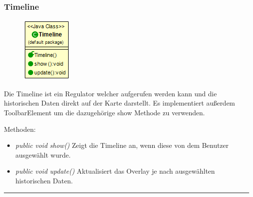 \subsubsection{Timeline}
\begin{minipage}{0.3\textwidth}
    \begin{figure}[H]
        {\centering\includegraphics[scale = 0.7
        ]{media/view/toolbar/Timeline_Class.png}}
    \end{figure}
    \end{minipage} \hfill
    \begin{minipage}{0.6\textwidth}
Die Timeline ist ein Regulator welcher aufgerufen werden kann und die historischen Daten direkt auf der Karte darstellt. Es implementiert außerdem ToolbarElement um die dazugehörige show Methode zu verwenden.
\end{minipage}
Methoden: \begin{itemize} [noitemsep]
    \item \emph{public void show()} Zeigt die Timeline an, wenn diese von dem Benutzer ausgewählt wurde.
    \item \emph{public void update()} Aktualisiert das Overlay je nach ausgewählten historischen Daten.
\end{itemize}

\rule{\textwidth}{0.4pt}
